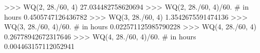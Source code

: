 
>>> WQ(2, 28./60, 4)
27.034482758620694
>>> WQ(2, 28./60, 4)/60. # in hours
0.4505747126436782
>>> WQ(3, 28./60, 4)
1.3542675591474136
>>> WQ(3, 28./60, 4)/60. # in hours
0.022571125985790228
>>> WQ(4, 28./60, 4)
0.26778942672317646
>>> WQ(4, 28./60, 4)/60. # in hours
0.004463157112052941

